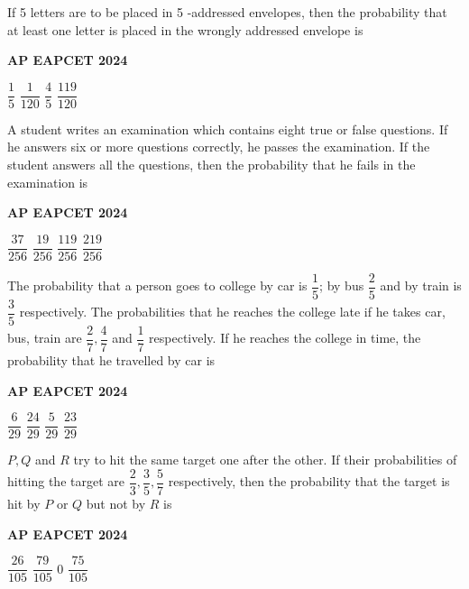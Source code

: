 \documentclass[11pt,paper=a4,answers]{exam}
\begin{document}
\begin{multicols}{2}
\begin{questions}
\question
If 5 letters are to be placed in 5 -addressed envelopes, then the probability that at least one letter is placed in the wrongly addressed envelope is
\begin{flushright}
\small\textbf{AP EAPCET 2024}
\end{flushright}
\begin{choices}
  \choice $\dfrac{1}{5}$
  \choice $\dfrac{1}{120}$
  \choice $\dfrac{4}{5}$
  \choice $\dfrac{119}{120}$
\end{choices}


\question
A student writes an examination which contains eight true or false questions. If he answers six or more questions correctly, he passes the examination. If the student answers all the questions, then the probability that he fails in the examination is
\begin{flushright}
\small\textbf{AP EAPCET 2024}
\end{flushright}
\begin{choices}
  \choice $\dfrac{37}{256}$
  \choice $\dfrac{19}{256}$
  \choice $\dfrac{119}{256}$
  \choice $\dfrac{219}{256}$
\end{choices}




\question
The probability that a person goes to college by car is $\dfrac{1}{5}$; by bus $\dfrac{2}{5}$ and by train is $\dfrac{3}{5}$ respectively. The probabilities that he reaches the college late if he takes car, bus, train are $\dfrac{2}{7}, \dfrac{4}{7}$ and $\dfrac{1}{7}$ respectively. If he reaches the college in time, the probability that he travelled by car is
\begin{flushright}
\small\textbf{AP EAPCET 2024}
\end{flushright}
\begin{choices}
  \choice $\dfrac{6}{29}$
  \choice $\dfrac{24}{29}$
  \choice $\dfrac{5}{29}$
  \choice $\dfrac{23}{29}$
\end{choices}



\question
$P, Q$ and $R$ try to hit the same target one after the other. If their probabilities of hitting the target are $\dfrac{2}{3}, \dfrac{3}{5}, \dfrac{5}{7}$ respectively, then the probability that the target is hit by $P$ or $Q$ but not by $R$ is
\begin{flushright}
\small\textbf{AP EAPCET 2024}
\end{flushright}
\begin{choices}
  \choice $\dfrac{26}{105}$
  \choice $\dfrac{79}{105}$
\choice $0$ 
  \choice $\dfrac{75}{105}$
\end{choices}



\end{questions}
\end{multicols}
\end{document}
